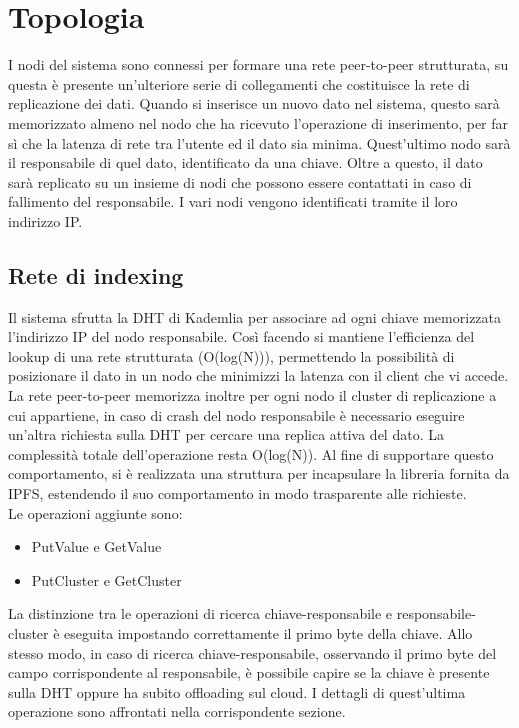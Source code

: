 \documentclass[conference]{IEEEtran}
\begin{document}
\section{Topologia}
I nodi del sistema sono connessi per formare una rete peer-to-peer strutturata, su questa è presente un'ulteriore serie di collegamenti
che costituisce la rete di replicazione dei dati. Quando si inserisce un nuovo dato nel sistema, questo sarà memorizzato
almeno nel nodo che ha ricevuto l'operazione di inserimento, per far sì che la latenza di rete tra l'utente ed il dato sia minima.
Quest'ultimo nodo sarà il responsabile di quel dato, identificato da una chiave. Oltre a questo, il dato sarà replicato
su un insieme di nodi che possono essere contattati in caso di fallimento del responsabile.
I vari nodi vengono identificati tramite il loro indirizzo IP.

\subsection{Rete di indexing}
Il sistema sfrutta la DHT di Kademlia per associare ad ogni chiave memorizzata l'indirizzo IP del nodo responsabile.
Così facendo si mantiene l'efficienza del lookup di una rete strutturata (O(log(N))), permettendo la possibilità di posizionare
il dato in un nodo che minimizzi la latenza con il client che vi accede. La rete peer-to-peer memorizza inoltre per ogni
nodo il cluster di replicazione a cui appartiene, in caso di crash del nodo responsabile è necessario eseguire un'altra richiesta sulla
DHT per cercare una replica attiva del dato. La complessità totale dell'operazione resta O(log(N)).
Al fine di supportare questo comportamento, si è realizzata una struttura per incapsulare la libreria fornita da IPFS,
estendendo il suo comportamento in modo trasparente alle richieste.\\
Le operazioni aggiunte sono:
\begin{itemize}
  \item {PutValue e GetValue}
  \item {PutCluster e GetCluster}
\end{itemize}
La distinzione tra le operazioni di ricerca chiave-responsabile e responsabile-cluster è eseguita impostando correttamente
il primo byte della chiave.
Allo stesso modo, in caso di ricerca chiave-responsabile, osservando il primo byte del campo corrispondente al responsabile,
è possibile capire se la chiave è presente sulla DHT oppure ha subito offloading sul cloud. I dettagli di quest'ultima
operazione sono affrontati nella corrispondente sezione.
\end{document}
